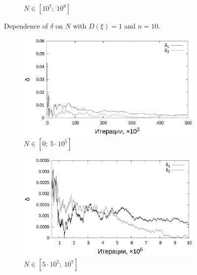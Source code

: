 \documentclass[11pt,a4paper]{article}
\theoremstyle{definition}
\begin{document}
\begin{figure}[h!]
\begin{subfigure}[b]{0.3\textwidth}
    \caption{$N \in [10^7;~10^8]$}
    \label{fig:classic_var1_n10_end}
  \end{subfigure}
  \caption{Dependence of $\delta$ on $N$ with $D(\xi) = 1$ and $n = 10$.}
  \label{fig:classic_var1_n10}
\end{figure}

\begin{figure}[h!]
  \begin{subfigure}[b]{0.3\textwidth}
    \includegraphics[width=\textwidth]{figs/classic/linear_log_1x_2_samples_50_variance_1_norm.log_0_500.eps}
    \caption{$N \in [0;~5 \cdot 10^5]$}
    \label{fig:classic_var1_n50_begin}
  \end{subfigure}
  \begin{subfigure}[b]{0.3\textwidth}
    \includegraphics[width=\textwidth]{figs/classic/linear_log_1x_2_samples_50_variance_1_norm.log_500_10000.eps}
    \caption{$N \in [5 \cdot 10^5;~10^7]$}
    \label{fig:classic_var1_n50_middle}
  \end{subfigure}
  \begin{subfigure}[b]{0.3\textwidth}

\end{subfigure}
\end{figure}
\end{document}
